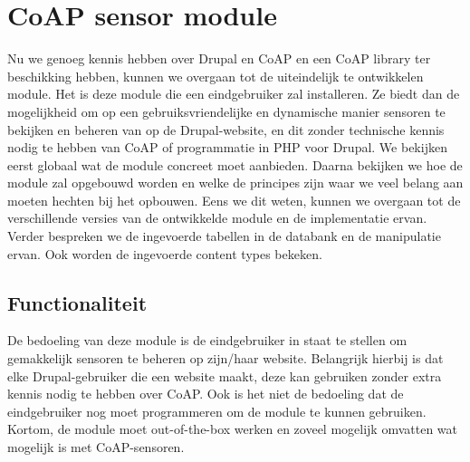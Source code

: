 \chapter{CoAP sensor module} \label{sensormodule}

Nu we genoeg kennis hebben over Drupal en CoAP en een CoAP library ter beschikking hebben, kunnen we overgaan tot de uiteindelijk te ontwikkelen module. Het is deze module die een eindgebruiker zal installeren. Ze biedt dan de mogelijkheid om op een gebruiksvriendelijke en dynamische manier sensoren te bekijken en beheren van op de Drupal-website, en dit zonder technische kennis nodig te hebben van CoAP of programmatie in PHP voor Drupal. We bekijken eerst globaal wat de module concreet moet aanbieden. Daarna bekijken we hoe de module zal opgebouwd worden en welke de principes zijn waar we veel belang aan moeten hechten bij het opbouwen. Eens we dit weten, kunnen we overgaan tot de verschillende versies van de ontwikkelde module en de implementatie ervan. Verder bespreken we de ingevoerde tabellen in de databank en de manipulatie ervan. Ook worden de ingevoerde content types bekeken.

\section{Functionaliteit}

De bedoeling van deze module is de eindgebruiker in staat te stellen om gemakkelijk sensoren te beheren op zijn/haar website. Belangrijk hierbij is dat elke Drupal-gebruiker die een website maakt, deze kan gebruiken zonder extra kennis nodig te hebben over CoAP. Ook is het niet de bedoeling dat de eindgebruiker nog moet programmeren om de module te kunnen gebruiken. Kortom, de module moet out-of-the-box werken en zoveel mogelijk omvatten wat mogelijk is met CoAP-sensoren.\\

